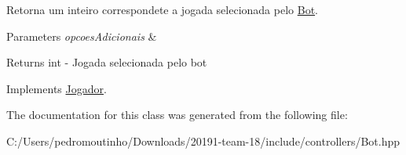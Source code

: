 Retorna um inteiro correspondete a jogada selecionada pelo \mbox{\hyperlink{class_bot}{Bot}}. 


\begin{DoxyParams}{Parameters}
{\em opcoes\+Adicionais} & \\
\hline
\end{DoxyParams}
\begin{DoxyReturn}{Returns}
int -\/ Jogada selecionada pelo bot 
\end{DoxyReturn}


Implements \mbox{\hyperlink{class_jogador_a8af760d8531f7d4e78fc767adcff0cb6}{Jogador}}.



The documentation for this class was generated from the following file\+:\begin{DoxyCompactItemize}
\item 
C\+:/\+Users/pedromoutinho/\+Downloads/20191-\/team-\/18/include/controllers/Bot.\+hpp\end{DoxyCompactItemize}
